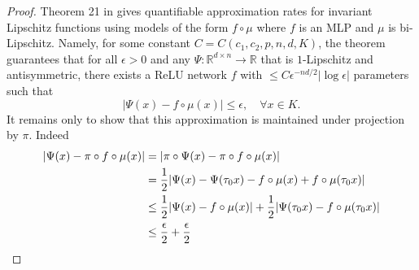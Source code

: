 \documentclass{amsart}
\theoremstyle{plain}
\theoremstyle{definition}
\theoremstyle{remark}
\newcommand{\RR}{\mathbb{R}}
\newcommand{\abs}[1]{\left\lvert#1\right\rvert}
\begin{document}
\begin{proof}
Theorem 21 in \cite{newPaper} gives quantifiable approximation rates for invariant Lipschitz functions using models of the form $f\circ \mu$ where $f$ is an MLP and $\mu$ is bi-Lipschitz. Namely,  for some constant $C=C\left(c_1,c_2, p,n,d,K \right)$, the theorem guarantees   that for all $\epsilon>0$ and any  $\Psi: \RR^{d\times n} \to \RR$ that is $1$-Lipschitz and antisymmetric, there exists a ReLU network $f$ with $\leq C\epsilon^{-nd/2} \abs{\log \epsilon} $ parameters such that 
\begin{equation}
    |\Psi(x)- f\circ \mu(x)|\leq \epsilon, \quad \forall x\in K .
\end{equation}
It remains only to show that this approximation is maintained under projection by $\pi$. Indeed
\begin{equation}
    \begin{split}
     {\abs{\Psi(x)-\pi\circ f \circ \mu (x)}}&= {\abs{\pi \circ\Psi(x)-\pi\circ f \circ \mu (x)}}\\
     &=\frac{1}{2}|\Psi(x)-\Psi(\tau_0x)-f\circ \mu(x)+f\circ \mu(\tau_0 x) |\\
&\leq \frac{1}{2}|\Psi(x)-f\circ \mu(x)|+\frac{1}{2}|\Psi(\tau_0x)-f\circ \mu(\tau_0 x) |\\
&\leq \frac{\epsilon}{2}+\frac{\epsilon}{2}   \qedhere
    \end{split} 
\end{equation}
\end{proof}
\end{document}
